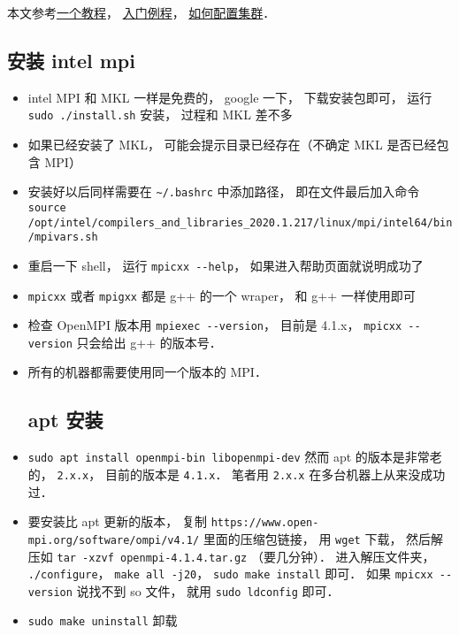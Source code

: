 
\begin{issues}
\issueDraft
\end{issues}

本文参考\href{https://www.codingame.com/playgrounds/349/introduction-to-mpi/introduction-to-distributed-computing}{一个教程}， \href{https://people.sc.fsu.edu/~jburkardt/cpp_src/hello_mpi/hello_mpi.html}{入门例程}， \href{https://mpitutorial.com/tutorials/running-an-mpi-cluster-within-a-lan/}{如何配置集群}．

\subsection{安装 intel mpi}
\begin{itemize}
\item intel MPI 和 MKL 一样是免费的， google 一下， 下载安装包即可， 运行 \verb`sudo ./install.sh` 安装， 过程和 MKL 差不多
\item 如果已经安装了 MKL， 可能会提示目录已经存在（不确定 MKL 是否已经包含 MPI）
\item 安装好以后同样需要在 \verb`~/.bashrc` 中添加路径， 即在文件最后加入命令 \verb`source /opt/intel/compilers_and_libraries_2020.1.217/linux/mpi/intel64/bin/mpivars.sh`
\item 重启一下 shell， 运行 \verb`mpicxx --help`， 如果进入帮助页面就说明成功了
\item \verb`mpicxx` 或者 \verb`mpigxx` 都是 g++ 的一个 wraper， 和 g++ 一样使用即可
\item 检查 OpenMPI 版本用 \verb|mpiexec --version|， 目前是 4.1.x， \verb|mpicxx --version| 只会给出 g++ 的版本号．
\item 所有的机器都需要使用同一个版本的 MPI．

\subsection{apt 安装}
\item \verb|sudo apt install openmpi-bin libopenmpi-dev| 然而 apt 的版本是非常老的， \verb|2.x.x|， 目前的版本是 \verb|4.1.x|． 笔者用 \verb|2.x.x| 在多台机器上从来没成功过．
\item 要安装比 apt 更新的版本， 复制 \verb|https://www.open-mpi.org/software/ompi/v4.1/| 里面的压缩包链接， 用 \verb|wget| 下载， 然后解压如 \verb|tar -xzvf openmpi-4.1.4.tar.gz| （要几分钟）． 进入解压文件夹， \verb|./configure|， \verb|make all -j20|， \verb|sudo make install| 即可． 如果 \verb|mpicxx --version| 说找不到 so 文件， 就用 \verb|sudo ldconfig| 即可．
\item \verb|sudo make uninstall| 卸载
\end{itemize}

